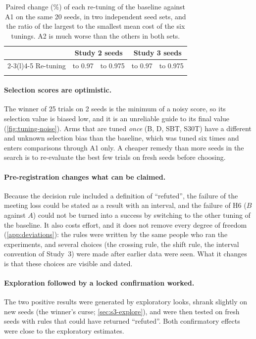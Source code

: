\begin{table}[t]
\centering\small
\caption{Paired change (\%) of each re-tuning of the baseline against A1 on the same 20 seeds, in two independent seed sets, and the ratio of the largest to the smallest mean cost of the six tunings. A2 is much worse than the others in both sets.}
\label{tab:shift}
\begin{tabular}{@{}l rr rr@{}}
\toprule
 & \multicolumn{2}{c}{Study 2 seeds} & \multicolumn{2}{c}{Study 3 seeds}\\
\cmidrule(lr){2-3}\cmidrule(l){4-5}
Re-tuning & to 0.97 & to 0.975 & to 0.97 & to 0.975\\
\midrule
\\
\bottomrule
\end{tabular}
\end{table}

\paragraph{Selection scores are optimistic.} The winner of 25 trials on 2 seeds is the minimum of a noisy score, so its selection value is biased low, and it is an unreliable guide to its final value (\cref{fig:tuning-noise}). Arms that are tuned \emph{once} (B, D, SBT, S30T) have a different and unknown selection bias than the baseline, which was tuned six times and enters comparisons through A1 only. A cheaper remedy than more seeds in the search is to re-evaluate the best few trials on fresh seeds before choosing.

\paragraph{Pre-registration changes what can be claimed.} Because the decision rule included a definition of ``refuted'', the failure of the meeting loss could be stated as a result with an interval, and the failure of H6 ($B$ against $A$) could not be turned into a success by switching to the other tuning of the baseline. It also costs effort, and it does not remove every degree of freedom (\cref{app:deviations}): the rules were written by the same people who ran the experiments, and several choices (the crossing rule, the shift rule, the interval convention of Study~3) were made after earlier data were seen. What it changes is that these choices are visible and dated.

\paragraph{Exploration followed by a locked confirmation worked.} The two positive results were generated by exploratory looks, shrank slightly on new seeds (the winner's curse; \cref{sec:s3-explore}), and were then tested on fresh seeds with rules that could have returned ``refuted''. Both confirmatory effects were close to the exploratory estimates.

